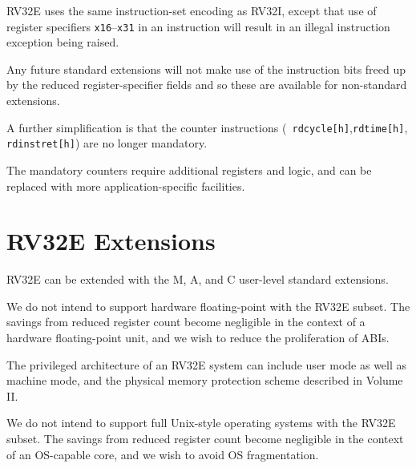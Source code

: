 RV32E uses the same instruction-set encoding as RV32I, except that use
of register specifiers {\tt x16}--{\tt x31} in an instruction will
result in an illegal instruction exception being raised.

\begin{commentary}
Any future standard extensions will not make use of the instruction
bits freed up by the reduced register-specifier fields and so these
are available for non-standard extensions.
\end{commentary}

A further simplification is that the counter instructions ({\tt
  rdcycle[h]},{\tt rdtime[h]}, {\tt rdinstret[h]}) are no longer
mandatory.

\begin{commentary}
The mandatory counters require additional registers and logic, and can
be replaced with more application-specific facilities.
\end{commentary}

\section{RV32E Extensions}

RV32E can be extended with the M, A, and C user-level standard extensions.

\begin{commentary}
We do not intend to support hardware floating-point with the RV32E
subset.  The savings from reduced register count become negligible in
the context of a hardware floating-point unit, and we wish to reduce
the proliferation of ABIs.
\end{commentary}

The privileged architecture of an RV32E system can include user mode
as well as machine mode, and the physical memory protection
scheme described in Volume II.

\begin{commentary}
We do not intend to support full Unix-style operating systems with the
RV32E subset.  The savings from reduced register count become
negligible in the context of an OS-capable core, and we wish to avoid
OS fragmentation.
\end{commentary}


